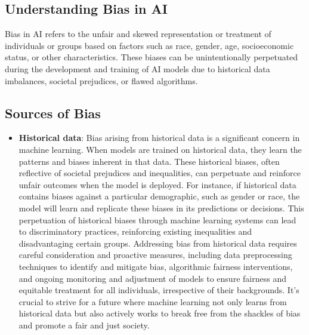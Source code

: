 \documentclass[12pt,a4paper,openright,twoside]{book}
\begin{document}
\subsection{Understanding Bias in AI}
Bias in AI refers to the unfair and skewed representation or treatment of individuals or groups based on factors such as race, gender, age, socioeconomic status, or other characteristics. These biases can be unintentionally perpetuated during the development and training of AI models due to historical data imbalances, societal prejudices, or flawed algorithms.

\subsection{Sources of Bias}
\begin{itemize}
    \item \textbf{Historical data}: Bias arising from historical data is a significant concern in machine learning. When models are trained on historical data, they learn the patterns and biases inherent in that data. These historical biases, often reflective of societal prejudices and inequalities, can perpetuate and reinforce unfair outcomes when the model is deployed. For instance, if historical data contains biases against a particular demographic, such as gender or race, the model will learn and replicate these biases in its predictions or decisions. This perpetuation of historical biases through machine learning systems can lead to discriminatory practices, reinforcing existing inequalities and disadvantaging certain groups. Addressing bias from historical data requires careful consideration and proactive measures, including data preprocessing techniques to identify and mitigate bias, algorithmic fairness interventions, and ongoing monitoring and adjustment of models to ensure fairness and equitable treatment for all individuals, irrespective of their backgrounds. It's crucial to strive for a future where machine learning not only learns from historical data but also actively works to break free from the shackles of bias and promote a fair and just society. \cite{10.1145/3308560.3317590}

\end{itemize}
\end{document}
